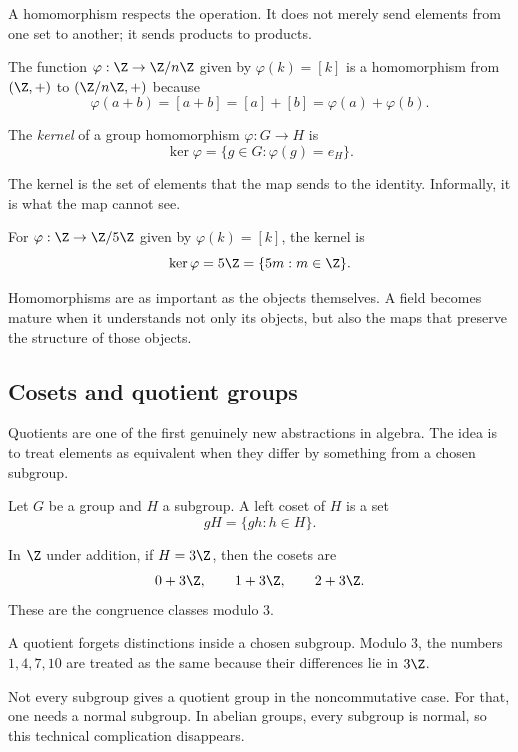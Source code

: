 A homomorphism respects the operation. It does not merely send elements from
one set to another; it sends products to products.

\begin{example}
The function $\varphi:\Z\to\Z/n\Z$ given by $\varphi(k)=[k]$ is a homomorphism
from $(\Z,+)$ to $(\Z/n\Z,+)$ because
\[
\varphi(a+b)=[a+b]=[a]+[b]=\varphi(a)+\varphi(b).
\]
\end{example}

\begin{definition}
The \emph{kernel} of a group homomorphism $\varphi:G\to H$ is
\[
\ker\varphi=\{g\in G:\varphi(g)=e_H\}.
\]
\end{definition}

The kernel is the set of elements that the map sends to the identity. Informally,
it is what the map cannot see.

\begin{example}
For $\varphi:\Z\to\Z/5\Z$ given by $\varphi(k)=[k]$, the kernel is
\[
\ker\varphi=5\Z=\{5m:m\in\Z\}.
\]
\end{example}

\begin{focusbox}
Homomorphisms are as important as the objects themselves. A field becomes mature
when it understands not only its objects, but also the maps that preserve the
structure of those objects.
\end{focusbox}

\subsection{Cosets and quotient groups}

Quotients are one of the first genuinely new abstractions in algebra. The idea
is to treat elements as equivalent when they differ by something from a chosen
subgroup.

Let $G$ be a group and $H$ a subgroup. A left coset of $H$ is a set
\[
gH=\{gh:h\in H\}.
\]

In $\Z$ under addition, if $H=3\Z$, then the cosets are
\[
0+3\Z,\qquad 1+3\Z,\qquad 2+3\Z.
\]
These are the congruence classes modulo $3$.

\begin{intuitionbox}
A quotient forgets distinctions inside a chosen subgroup. Modulo $3$, the
numbers $1,4,7,10$ are treated as the same because their differences lie in
$3\Z$.
\end{intuitionbox}

Not every subgroup gives a quotient group in the noncommutative case. For that,
one needs a normal subgroup. In abelian groups, every subgroup is normal, so this
technical complication disappears.

